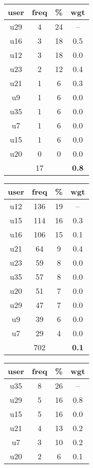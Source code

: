 \begin{appendices}
\begin{table}
\centering
\begin{tabular}{ |c|c|c|c| }
	\hline
	\textbf{user} & \textbf{freq} & \textbf{\%} & \textbf{wgt} \\
	\hline
	u29 & 4 & 24 & -- \\
	u16 & 3 & 18 & 0.5 \\
	u12 & 3 & 18 & 0.0 \\
	u23 & 2 & 12 & 0.4 \\
	u21 & 1 & 6 & 0.3 \\
	u9 & 1 & 6 & 0.0 \\
	u35 & 1 & 6 & 0.0 \\
	u7 & 1 & 6 & 0.0 \\
	u15 & 1 & 6 & 0.0 \\
	u20 & 0 & 0 & 0.0 \\
	 & 17 & & \textbf{0.8} \\
	\hline
\end{tabular}
\begin{tabular}{ |c|c|c|c| }
	\hline
	\textbf{user} & \textbf{freq} & \textbf{\%} & \textbf{wgt} \\
	\hline
	u12 & 136 & 19 & -- \\
	u15 & 114 & 16 & 0.3 \\
	u16 & 106 & 15 & 0.1 \\
	u21 & 64 & 9 & 0.4 \\
	u23 & 59 & 8 & 0.0 \\
	u35 & 57 & 8 & 0.0 \\
	u20 & 51 & 7 & 0.0 \\
	u29 & 47 & 7 & 0.0 \\
	u9 & 39 & 6 & 0.0 \\
	u7 & 29 & 4 & 0.0 \\
	 & 702 & & \textbf{0.1} \\
	\hline
\end{tabular}
\begin{tabular}{ |c|c|c|c| }
	\hline
	\textbf{user} & \textbf{freq} & \textbf{\%} & \textbf{wgt} \\
	\hline
	u35 & 8 & 26 & -- \\
	u29 & 5 & 16 & 0.8 \\
	u15 & 5 & 16 & 0.0 \\
	u21 & 4 & 13 & 0.2 \\
	u7 & 3 & 10 & 0.2 \\
	u20 & 2 & 6 & 0.1 \\

\end{tabular}
\end{table}
\end{appendices}
